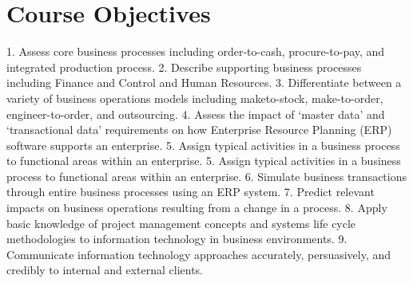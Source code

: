 \section {  Course Objectives }
    1.    Assess core business processes including order-to-cash, procure-to-pay, and integrated production process.
    2.    Describe supporting business processes including Finance and Control and Human Resources.
    3.    Differentiate between a variety of business operations models including maketo-stock, make-to-order, engineer-to-order, and outsourcing.
    4.    Assess the impact of ‘master data’ and ‘transactional data’ requirements on how Enterprise Resource Planning (ERP) software supports an enterprise.
    5.    Assign typical activities in a business process to functional areas within an enterprise.
    5.    Assign typical activities in a business process to functional areas within an enterprise.
    6.    Simulate business transactions through entire business processes using an ERP system.
    7.    Predict relevant impacts on business operations resulting from a change in a process.
    8.    Apply basic knowledge of project management concepts and systems life cycle methodologies to information technology in business environments.
    9.    Communicate information technology approaches accurately, persuasively, and credibly to internal and external clients.
  
